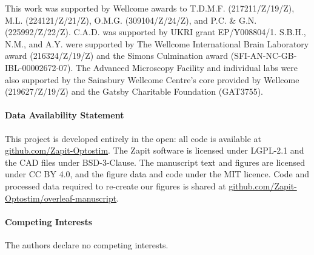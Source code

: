 \documentclass{preprint-raac}
\begin{document}
This work was supported by Wellcome awards to T.D.M.F. (217211/Z/19/Z), M.L. (224121/Z/21/Z), O.M.G. (309104/Z/24/Z), and P.C. \& G.N. (225992/Z/22/Z).
C.A.D. was supported by UKRI grant EP/Y008804/1.
S.B.H., N.M., and A.Y. were supported by The Wellcome International Brain Laboratory award (216324/Z/19/Z) and the Simons Culmination award (SFI-AN-NC-GB-IBL-00002672-07).
The Advanced Microscopy Facility and individual labs were also supported by the Sainsbury Wellcome Centre’s core provided by Wellcome (219627/Z/19/Z) and the Gatsby Charitable Foundation (GAT3755).

\paragraph*{Data Availability Statement}
This project is developed entirely in the open: all code is available at \href{https://github.com/Zapit-Optostim}{github.com/Zapit-Optostim}.
The Zapit software is licensed under LGPL-2.1 and the CAD files under BSD-3-Clause.
The manuscript text and figures are licensed under CC BY 4.0, and the figure data and code under the MIT licence.
Code and processed data required to re-create our figures is shared at \href{https://github.com/Zapit-Optostim/Zapit-eLife}{github.com/Zapit-Optostim/overleaf-manuscript}.


\paragraph*{Competing Interests}
The authors declare no competing interests.

\clearpage
\printbibliography


\end{document}
